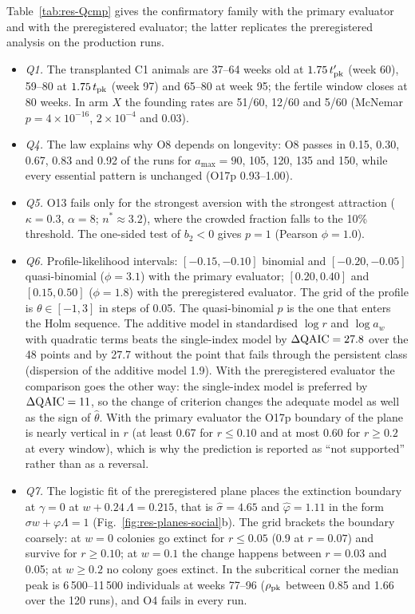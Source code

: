 Table~\ref{tab:res-Qcmp} gives the confirmatory family with the primary evaluator and with the preregistered evaluator;
the latter replicates the preregistered analysis on the production runs.
\begin{itemize}
  \item \emph{Q1.} The transplanted \textsf{C1} animals are 37--64 weeks old at $1.75\,t'_{\rm pk}$ (week 60), 59--80
    at $1.75\,t_{\rm pk}$ (week 97) and 65--80 at week 95; the fertile window closes at 80 weeks. In arm $X$ the
    founding rates are 51/60, 12/60 and 5/60 (McNemar $p=4\times10^{-16}$, $2\times10^{-4}$ and $0.03$).
  \item \emph{Q4.} The law explains why O8 depends on longevity: O8 passes in 0.15, 0.30, 0.67, 0.83 and 0.92 of the
    runs for $a_{\max}=90$, 105, 120, 135 and 150, while every essential pattern is unchanged (O17p 0.93--1.00).
  \item \emph{Q5.} O13 fails only for the strongest aversion with the strongest attraction ($\kappa=0.3$, $\alpha=8$;
    $n^*\approx3.2$), where the crowded fraction falls to the 10\% threshold. The one-sided test of $b_2<0$ gives
    $p=1$ (Pearson $\phi=1.0$).
  \item \emph{Q6.} Profile-likelihood intervals: $[-0.15,-0.10]$ binomial and $[-0.20,-0.05]$ quasi-binomial
    ($\phi=3.1$) with the primary evaluator; $[0.20,0.40]$ and $[0.15,0.50]$ ($\phi=1.8$) with the preregistered
    evaluator. The grid of the profile is $\theta\in[-1,3]$ in steps of 0.05. The quasi-binomial $p$ is the one that
    enters the Holm sequence. The additive model in standardised $\log r$ and $\log a_w$ with quadratic terms beats
    the single-index model by $\Delta{\rm QAIC}=27.8$ over the 48 points and by 27.7 without the point that fails
    through the persistent class (dispersion of the additive model 1.9). With the preregistered evaluator the comparison
    goes the other way: the single-index model is preferred by $\Delta{\rm QAIC}=11$, so the change of criterion
    changes the adequate model as well as the sign of $\hat\theta$. With the primary evaluator the O17p boundary of
    the plane is nearly vertical in $r$ (at least 0.67 for $r\le0.10$ and at most 0.60 for $r\ge0.2$ at every
    window), which is why the prediction is reported as ``not supported'' rather than as a reversal.
  \item \emph{Q7.} The logistic fit of the preregistered plane places the extinction boundary at $\gamma=0$ at
    $w+0.24\,\Lambda=0.215$, that is $\hat\sigma=4.65$ and $\hat\varphi=1.11$ in the form $\sigma w+\varphi\Lambda=1$
    (Fig.~\ref{fig:res-planes-social}b). The grid brackets the boundary coarsely: at $w=0$ colonies go extinct for
    $r\le0.05$ (0.9 at $r=0.07$) and survive for $r\ge0.10$; at $w=0.1$ the change happens between $r=0.03$ and 0.05;
    at $w\ge0.2$ no colony goes extinct. In the subcritical corner the median peak is 6\,500--11\,500 individuals at
    weeks 77--96 ($\rho_{\rm pk}$ between 0.85 and 1.66 over the 120 runs), and O4 fails in every run.
\end{itemize}

